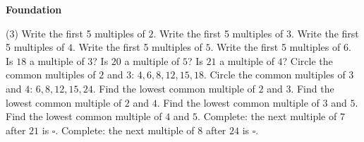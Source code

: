 \documentclass[17pt,a4paper,landscape]{extarticle}
\begin{document}
\sffamily
\boldmath

\boldmath

{\LARGE \textbf{Foundation}}
\begin{tasks}(3)
\task Write the first 5 multiples of \mbox{$2$}.
\task Write the first 5 multiples of \mbox{$3$}.
\task Write the first 5 multiples of \mbox{$4$}.
\task Write the first 5 multiples of \mbox{$5$}.
\task Write the first 5 multiples of \mbox{$6$}.
\task Is \mbox{$18$} a multiple of \mbox{$3$}?
\task Is \mbox{$20$} a multiple of \mbox{$5$}?
\task Is \mbox{$21$} a multiple of \mbox{$4$}?
\task Circle the common multiples of \mbox{$2$} and \mbox{$3$}: \mbox{$4, 6, 8, 12, 15, 18$}.
\task Circle the common multiples of \mbox{$3$} and \mbox{$4$}: \mbox{$6, 8, 12, 15, 24$}.
\task Find the lowest common multiple of \mbox{$2$} and \mbox{$3$}.
\task Find the lowest common multiple of \mbox{$2$} and \mbox{$4$}.
\task Find the lowest common multiple of \mbox{$3$} and \mbox{$5$}.
\task Find the lowest common multiple of \mbox{$4$} and \mbox{$5$}.
\task Complete: the next multiple of \mbox{$7$} after \mbox{$21$} is \mbox{$\square$}.
\task Complete: the next multiple of \mbox{$8$} after \mbox{$24$} is \mbox{$\square$}.
\end{tasks}
\end{document}
